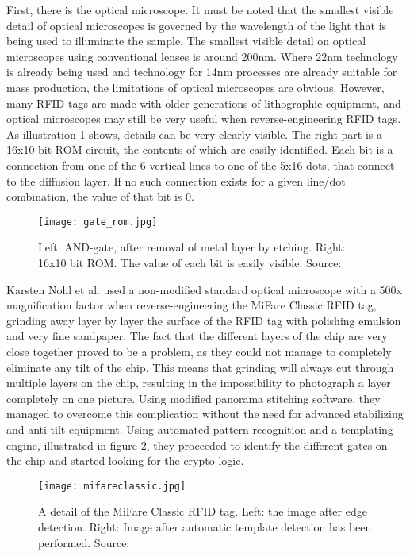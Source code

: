 \documentclass{llncs}
\begin{document}
First, there is the optical microscope. It must be noted that the smallest visible detail of optical microscopes is governed by the wavelength of the light that is being used to illuminate the sample. The smallest visible detail on optical microscopes using conventional lenses is around 200nm. Where 22nm technology is already being used and technology for 14nm processes are already suitable for mass production\cite{web:14nm}, the limitations of optical microscopes are obvious. However, many RFID tags are made with older generations of lithographic equipment, and optical microscopes may still be very useful when reverse-engineering RFID tags. As illustration \ref{fig:gate_rom} shows, details can be very clearly visible. The right part is a 16x10 bit ROM circuit, the contents of which are easily identified. Each bit is a connection from one of the 6 vertical lines to one of the 5x16 dots, that connect to the diffusion layer. If no such connection exists for a given line/dot combination, the value of that bit is 0. 

\begin{figure}[ht!]
\centering
\texttt{[image: gate\_rom.jpg]}
\caption{Left: AND-gate, after removal of metal layer by etching. Right: 16x10 bit ROM. The value of each bit is easily visible. Source: \cite{doc:kommerling}}
\label{fig:gate_rom}
\end{figure}

Karsten Nohl et al.\cite{doc:karstennohl} used a non-modified standard optical microscope with a 500x magnification factor when reverse-engineering the MiFare Classic RFID tag, grinding away layer by layer the surface of the RFID tag with polishing emulsion and very fine sandpaper. The fact that the different layers of the chip are very close together proved to be a problem, as they could not manage to completely eliminate any tilt of the chip. This means that grinding will always cut through multiple layers on the chip, resulting in the impossibility to photograph a layer completely on one picture. Using modified panorama stitching software, they managed to overcome this complication without the need for advanced stabilizing and anti-tilt equipment. Using automated pattern recognition and a templating engine, illustrated in figure \ref{fig:mifareclassic}, they proceeded to identify the different gates on the chip and started looking for the crypto logic. 

\begin{figure}[ht!]
\centering
\texttt{[image: mifareclassic.jpg]}
\caption{A detail of the MiFare Classic RFID tag. Left: the image after edge detection. Right: Image after automatic template detection has been performed. Source: \cite{doc:karstennohl}}
\label{fig:mifareclassic}
\end{figure}
\end{document}
